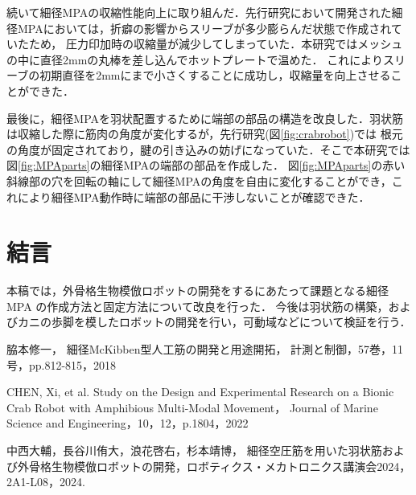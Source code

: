 \documentclass{jarticle}
\begin{document}
続いて細径MPAの収縮性能向上に取り組んだ．先行研究において開発された細径MPAにおいては，折癖の影響からスリーブが多少膨らんだ状態で作成されていたため，
圧力印加時の収縮量が減少してしまっていた．本研究ではメッシュの中に直径2mmの丸棒を差し込んでホットプレートで温めた．
これによりスリーブの初期直径を2mmにまで小さくすることに成功し，収縮量を向上させることができた．


最後に，細径MPAを羽状配置するために端部の部品の構造を改良した．羽状筋は収縮した際に筋肉の角度が変化するが，先行研究(図\ref{fig:crabrobot})では
根元の角度が固定されており，腱の引き込みの妨げになっていた．そこで本研究では図\ref{fig:MPAparts}の細径MPAの端部の部品を作成した．
図\ref{fig:MPAparts}の赤い斜線部の穴を回転の軸にして細径MPAの角度を自由に変化することができ，これにより細径MPA動作時に端部の部品に干渉しないことが確認できた．

\vspace*{-2mm}
\section{結言}

本稿では，外骨格生物模倣ロボットの開発をするにあたって課題となる細径MPA の作成方法と固定方法について改良を行った．
今後は羽状筋の構築，およびカニの歩脚を模したロボットの開発を行い，可動域などについて検証を行う．

\begin{thebibliography}{99}

  脇本修一，
  細径McKibben型人工筋の開発と用途開拓，
  計測と制御，57巻，11号，pp.812-815，2018
  
  CHEN, Xi, et al. Study on the Design and Experimental Research on a Bionic Crab Robot with Amphibious Multi-Modal Movement， Journal of Marine Science and Engineering，10，12，p.1804，2022
  
  中西大輔，長谷川侑大，浪花啓右，杉本靖博，
  細径空圧筋を用いた羽状筋および外骨格生物模倣ロボットの開発，ロボティクス・メカトロニクス講演会2024，2A1-L08，2024.

 \end{thebibliography}
\end{document}
